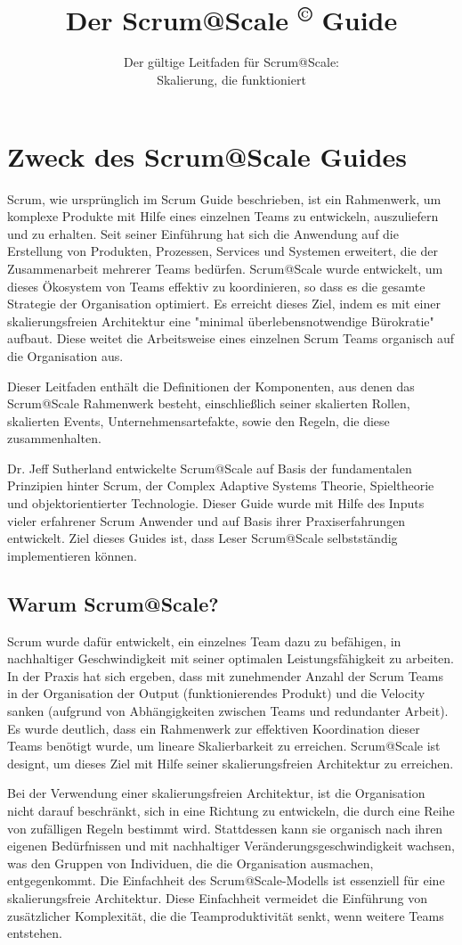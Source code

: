 \documentclass[12pt,a4paper,parskip=full]{scrartcl}
\title{\Huge{\color{red}\textbf{Der Scrum@Scale
\textsuperscript{\copyright}
Guide}}}
\subtitle{\color{gray}Der gültige Leitfaden für Scrum@Scale:\\ Skalierung, die funktioniert}
\date{}
\begin{document}

\section{Zweck des Scrum@Scale Guides}
Scrum, wie ursprünglich im Scrum Guide beschrieben, ist ein Rahmenwerk,
um komplexe Produkte mit Hilfe eines einzelnen Teams zu entwickeln,
auszuliefern und zu erhalten. Seit seiner Einführung hat sich die Anwendung
auf die Erstellung von Produkten, Prozessen, Services und Systemen erweitert,
die der Zusammenarbeit mehrerer Teams bedürfen. Scrum@Scale wurde entwickelt,
um dieses Ökosystem von Teams effektiv zu koordinieren, so dass es die gesamte
Strategie der Organisation optimiert. Es erreicht dieses Ziel, indem es mit
einer skalierungsfreien Architektur eine "minimal überlebensnotwendige
Bürokratie" aufbaut. Diese weitet die Arbeitsweise eines einzelnen Scrum Teams
organisch auf die Organisation aus.

Dieser Leitfaden enthält die Definitionen der Komponenten, aus denen das
Scrum@Scale Rahmenwerk besteht, einschließlich seiner skalierten Rollen,
skalierten Events, Unternehmensartefakte, sowie den Regeln, die diese
zusammenhalten.

Dr. Jeff Sutherland entwickelte Scrum@Scale auf Basis der fundamentalen
Prinzipien hinter Scrum, der Complex Adaptive Systems Theorie, Spieltheorie und
objektorientierter Technologie. Dieser Guide wurde mit Hilfe des Inputs vieler
erfahrener Scrum Anwender und auf Basis ihrer Praxiserfahrungen entwickelt. Ziel
dieses Guides ist, dass Leser Scrum@Scale selbstständig implementieren können.

\subsection{Warum Scrum@Scale?}
Scrum wurde dafür entwickelt, ein einzelnes Team dazu zu befähigen, in
nachhaltiger Geschwindigkeit mit seiner optimalen Leistungsfähigkeit zu
arbeiten. In der Praxis hat sich ergeben, dass mit zunehmender Anzahl der
Scrum Teams in der Organisation der Output (funktionierendes Produkt) und die
Velocity sanken (aufgrund von Abhängigkeiten zwischen Teams und redundanter Arbeit).
Es wurde deutlich, dass ein Rahmenwerk zur effektiven Koordination dieser Teams
benötigt wurde, um lineare Skalierbarkeit zu erreichen. Scrum@Scale ist designt,
um dieses Ziel mit Hilfe seiner skalierungsfreien Architektur zu erreichen.


Bei der Verwendung einer skalierungsfreien Architektur, ist die Organisation
nicht darauf beschränkt, sich in eine Richtung zu entwickeln, die durch eine
Reihe von zufälligen Regeln bestimmt wird. Stattdessen kann sie organisch nach
ihren eigenen Bedürfnissen und mit nachhaltiger Veränderungsgeschwindigkeit
wachsen, was den Gruppen von Individuen, die die Organisation ausmachen,
entgegenkommt. Die Einfachheit des Scrum@Scale-Modells ist essenziell für eine
skalierungsfreie Architektur. Diese Einfachheit vermeidet die Einführung von
zusätzlicher Komplexität, die die Teamproduktivität senkt, wenn weitere Teams
entstehen.
\end{document}
